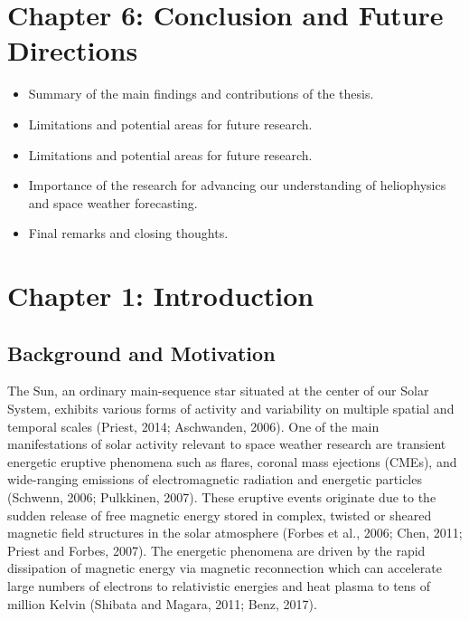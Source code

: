 \documentclass{article}
\begin{document}
\section{Chapter 6: Conclusion and Future Directions}
\begin{itemize}
    \item Summary of the main findings and contributions of the thesis.
    \item Limitations and potential areas for future research.
    \item Limitations and potential areas for future research.
    \item Importance of the research for advancing our understanding of heliophysics and space weather forecasting.
    \item Final remarks and closing thoughts.
\end{itemize}






\section{Chapter 1: Introduction}
\subsection{Background and Motivation}

The Sun, an ordinary main-sequence star situated at the center of our Solar System, exhibits various forms of activity and variability on multiple spatial and temporal scales (Priest, 2014; Aschwanden, 2006). One of the main manifestations of solar activity relevant to space weather research are transient energetic eruptive phenomena such as flares, coronal mass ejections (CMEs), and wide-ranging emissions of electromagnetic radiation and energetic particles (Schwenn, 2006; Pulkkinen, 2007). These eruptive events originate due to the sudden release of free magnetic energy stored in complex, twisted or sheared magnetic field structures in the solar atmosphere (Forbes et al., 2006; Chen, 2011; Priest and Forbes, 2007). The energetic phenomena are driven by the rapid dissipation of magnetic energy via magnetic reconnection which can accelerate large numbers of electrons to relativistic energies and heat plasma to tens of million Kelvin (Shibata and Magara, 2011; Benz, 2017).
\end{document}
